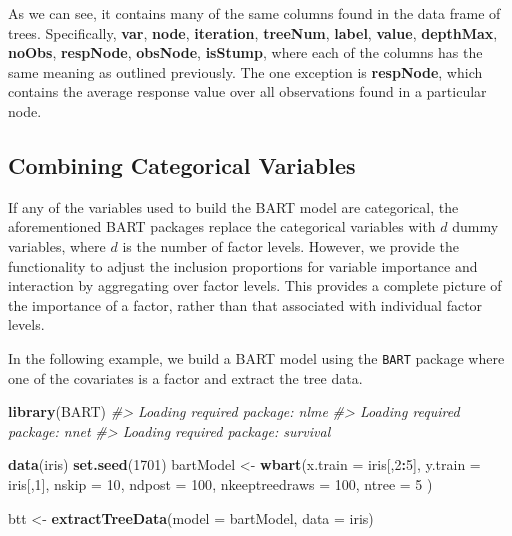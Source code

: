 \documentclass[
]{article}
\newenvironment{Shaded}{\begin{snugshade}}{\end{snugshade}}
\newcommand{\AttributeTok}[1]{\textcolor[rgb]{0.13,0.29,0.53}{#1}}
\newcommand{\CommentTok}[1]{\textcolor[rgb]{0.56,0.35,0.01}{\textit{#1}}}
\newcommand{\DecValTok}[1]{\textcolor[rgb]{0.00,0.00,0.81}{#1}}
\newcommand{\FunctionTok}[1]{\textcolor[rgb]{0.13,0.29,0.53}{\textbf{#1}}}
\newcommand{\NormalTok}[1]{#1}
\newcommand{\OtherTok}[1]{\textcolor[rgb]{0.56,0.35,0.01}{#1}}
\newcommand{\SpecialCharTok}[1]{\textcolor[rgb]{0.81,0.36,0.00}{\textbf{#1}}}
\begin{document}
As we can see, it contains many of the same columns found in the data
frame of trees. Specifically, \textbf{var}, \textbf{node},
\textbf{iteration}, \textbf{treeNum}, \textbf{label}, \textbf{value},
\textbf{depthMax}, \textbf{noObs}, \textbf{respNode}, \textbf{obsNode},
\textbf{isStump}, where each of the columns has the same meaning as
outlined previously. The one exception is \textbf{respNode}, which
contains the average response value over all observations found in a
particular node.

\hypertarget{combining-categorical-variables}{%
\subsection{Combining Categorical
Variables}\label{combining-categorical-variables}}

If any of the variables used to build the BART model are categorical,
the aforementioned BART packages replace the categorical variables with
\(d\) dummy variables, where \(d\) is the number of factor levels.
However, we provide the functionality to adjust the inclusion
proportions for variable importance and interaction by aggregating over
factor levels. This provides a complete picture of the importance of a
factor, rather than that associated with individual factor levels.

In the following example, we build a BART model using the \texttt{BART}
package where one of the covariates is a factor and extract the tree
data.

\begin{Shaded}
\begin{Highlighting}[]
\FunctionTok{library}\NormalTok{(BART)}
\CommentTok{\#\textgreater{} Loading required package: nlme}
\CommentTok{\#\textgreater{} Loading required package: nnet}
\CommentTok{\#\textgreater{} Loading required package: survival}

\FunctionTok{data}\NormalTok{(iris)}
\FunctionTok{set.seed}\NormalTok{(}\DecValTok{1701}\NormalTok{)}
\NormalTok{bartModel }\OtherTok{\textless{}{-}} \FunctionTok{wbart}\NormalTok{(}\AttributeTok{x.train =}\NormalTok{ iris[,}\DecValTok{2}\SpecialCharTok{:}\DecValTok{5}\NormalTok{],}
                   \AttributeTok{y.train =}\NormalTok{ iris[,}\DecValTok{1}\NormalTok{],}
                   \AttributeTok{nskip =} \DecValTok{10}\NormalTok{,}
                   \AttributeTok{ndpost =} \DecValTok{100}\NormalTok{,}
                   \AttributeTok{nkeeptreedraws =} \DecValTok{100}\NormalTok{,}
                   \AttributeTok{ntree =} \DecValTok{5}
\NormalTok{)}

\NormalTok{btt }\OtherTok{\textless{}{-}} \FunctionTok{extractTreeData}\NormalTok{(}\AttributeTok{model =}\NormalTok{ bartModel, }\AttributeTok{data =}\NormalTok{ iris)}
\end{Highlighting}
\end{Shaded}
\end{document}
